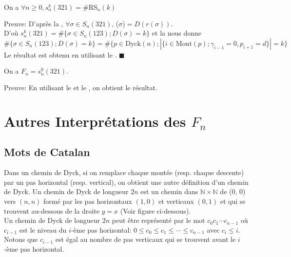 \begin{corollaire} \label{avoiding_321_and_SR_n}
	On a $\forall n \geq 0, s_{n}^{k}(321)=\#$\rm{RS}$_{n}(k)$
\end{corollaire}
Preuve: D'après la , $\forall \sigma \in S_{n}(321)$, ($\sigma$)$=D(r(\sigma))$. \\
D'où $s_{n}^{k}(321) = \#\{\sigma \in S_{n}(123); D(\sigma)=k\}$ et la  nous donne 
\[
	\#\{\sigma \in S_{n}(123); D(\sigma)=k\} = \#\{p\in \text{Dyck}(n); |\{i \in \text{Mont}(p); \gamma_{i-1}=0, p_{i+1}=d\}|=k\}
\]
Le résultat est obtenu en utilisant le . $\blacksquare$


\begin{corollaire} \label{fn_and_avoiding_321_without_fix}
	On a $F_{n} = s_{n}^{0}(321)$.
\end{corollaire}
Preuve:
En utilisant le  et le , on obtient le résultat.

\section{Autres Interprétations des $F_{n}$}
\subsection{Mots de Catalan}
Dans un chemin de Dyck, si on remplace chaque montée (resp. chaque descente) par un pas horizontal (resp. vertical), on obtient une autre définition d’un chemin de Dyck. Un chemin de Dyck de longueur $2n$ est un chemin dans $\mathbb{N}\times \mathbb{N}$ de (0, 0) vers $(n, n)$ formé par les pas horizontaux $(1, 0)$ et verticaux $(0, 1)$ et qui se trouvent au-dessous de la droite $y = x$ (Voir figure ci-dessous).\\Un chemin de Dyck de longueur $2n$ peut être représenté par le mot $c_{0}c_{1} \cdots c_{n-1}$ où $c_{i-1}$ est le niveau du $i$-ème pas horizontal: $0 \leq c_{0} \leq c_{1} \leq \cdots \leq c_{n-1}$ avec $c_{i} \leq i$. Notons que $c_{i-1}$ est égal au nombre de pas verticaux qui se trouvent avant le $i$-ème pas horizontal.\vspace{15pt}

